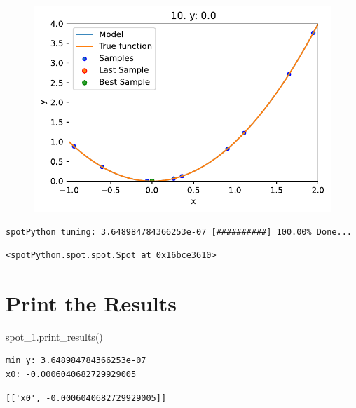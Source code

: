 \documentclass[
  letterpaper,
  DIV=11,
  numbers=noendperiod]{scrreprt}
\newenvironment{Shaded}{\begin{snugshade}}{\end{snugshade}}
\newcommand{\NormalTok}[1]{\textcolor[rgb]{0.00,0.23,0.31}{#1}}
\begin{document}
\begin{figure}[H]

{\centering \includegraphics{007_num_spot_intro_files/figure-pdf/cell-10-output-2.pdf}

}

\end{figure}

\begin{verbatim}
spotPython tuning: 3.648984784366253e-07 [##########] 100.00% Done...
\end{verbatim}

\begin{verbatim}
<spotPython.spot.spot.Spot at 0x16bce3610>
\end{verbatim}

\hypertarget{print-the-results-1}{%
\section{Print the Results}\label{print-the-results-1}}

\begin{Shaded}
\begin{Highlighting}[]
\NormalTok{spot\_1.print\_results()}
\end{Highlighting}
\end{Shaded}

\begin{verbatim}
min y: 3.648984784366253e-07
x0: -0.0006040682729929005
\end{verbatim}

\begin{verbatim}
[['x0', -0.0006040682729929005]]
\end{verbatim}
\end{document}

